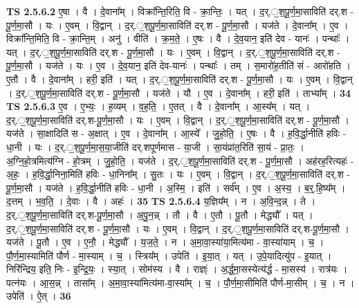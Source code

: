 \documentclass[17pt]{extarticle}
\begin{document}
                  \newline
                                \textbf{ TS 2.5.6.2} \newline
                  ए॒षा । वै । दे॒वाना᳚म् । विक्रा᳚न्ति॒रिति॒ वि - क्रा॒न्तिः॒ । यत् । द॒र्.॒श॒पू॒र्ण॒मा॒साविति॑ दर्.श - पू॒र्ण॒मा॒सौ । यः । ए॒वम् । वि॒द्वान् । द॒र्.॒श॒पू॒र्ण॒मा॒साविति॑ दर्.श - पू॒र्ण॒मा॒सौ । यज॑ते । दे॒वाना᳚म् । ए॒व । विक्रा᳚न्ति॒मिति॒ वि - क्रा॒न्ति॒म् । अनु॑ । वीति॑ । क्र॒म॒ते॒ । ए॒षः । वै । दे॒व॒यान॒ इति॑ देव - यानः॑ । पन्थाः᳚ । यत् । द॒र्.॒श॒पू॒र्ण॒मा॒साविति॑ दर्.श - पू॒र्ण॒मा॒सौ । यः । ए॒वम् । वि॒द्वान् । द॒र्.॒श॒पू॒र्ण॒मा॒साविति॑ दर्.श - पू॒र्ण॒मा॒सौ । यज॑ते । यः । ए॒व । दे॒व॒यान॒ इति॑ देव-यानः॑ । पन्थाः᳚ । तम् । स॒मारो॑ह॒तीति॑ सं - आरो॑हति । ए॒तौ । वै । दे॒वाना᳚म् । हरी॒ इति॑ । यत् । द॒र्.॒श॒पू॒र्ण॒मा॒साविति॑ दर्.श - पू॒र्ण॒मा॒सौ । यः । ए॒वम् । वि॒द्वान् । द॒र्.॒श॒पू॒र्ण॒मा॒साविति॑ दर्.श - पू॒र्ण॒मा॒सौ । यज॑ते । यौ । ए॒व । दे॒वाना᳚म् । हरी॒ इति॑ । ताभ्या᳚म् । \textbf{  34} \newline
                  \newline
                                \textbf{ TS 2.5.6.3} \newline
                  ए॒व । ए॒भ्यः॒ । ह॒व्यम् । व॒ह॒ति॒ । ए॒तत् । वै । दे॒वाना᳚म् । आ॒स्य᳚म् । यत् । द॒र्.॒श॒पू॒र्ण॒मा॒साविति॑ दर्.श-पू॒र्ण॒मा॒सौ । यः । ए॒वम् । वि॒द्वान् । द॒र्.॒श॒पू॒र्ण॒मा॒साविति॑ दर्.श - पू॒र्ण॒मा॒सौ । यज॑ते । सा॒क्षादिति॑ स - अ॒क्षात् । ए॒व । दे॒वाना᳚म् । आ॒स्ये᳚ । जु॒हो॒ति॒ । ए॒षः । वै । ह॒वि॒र्द्धा॒नीति॑ हविः - धा॒नी । यः । द॒र्.॒श॒पू॒र्ण॒मा॒स॒या॒जीति॑ दर्.शपूर्णमास - या॒जी । सा॒यंप्रा॑त॒रिति॑ सा॒यं - प्रा॒तः॒ । अ॒ग्नि॒हो॒त्रमित्य॑ग्नि - हो॒त्रम् । जु॒हो॒ति॒ । यज॑ते । द॒र्.॒श॒पू॒र्ण॒मा॒साविति॑ दर्.श - पू॒र्ण॒मा॒सौ । अह॑रह॒रित्यहः॑ - अ॒हः॒ । ह॒वि॒र्द्धा॒निना॒मिति॑ हविः - धा॒निना᳚म् । सु॒तः । यः । ए॒वम् । वि॒द्वान् । द॒र्.॒श॒पू॒र्ण॒मा॒साविति॑ दर्.श - पू॒र्ण॒मा॒सौ । यज॑ते । ह॒वि॒र्द्धा॒नीति॑ हविः - धा॒नी । अ॒स्मि॒ । इति॑ । सर्व᳚म् । ए॒व । अ॒स्य॒ । ब॒र्॒.हि॒ष्य᳚म् । द॒त्तम् । भ॒व॒ति॒ । दे॒वाः । वै । अहः॑ । \textbf{  35} \newline
                  \newline
                                \textbf{ TS 2.5.6.4} \newline
                  य॒ज्ञिय᳚म् । न । अ॒वि॒न्द॒न्न् । ते । द॒र्.॒श॒पू॒र्ण॒मा॒साविति॑ दर्.श-पू॒र्ण॒मा॒सौ । अ॒पु॒न॒न्न् । तौ । वै । ए॒तौ । पू॒तौ । मेद्ध्यौ᳚ । यत् । द॒र्.॒श॒पू॒र्ण॒मा॒साविति॑ दर्.श - पू॒र्ण॒मा॒सौ । यः । ए॒वम् । वि॒द्वान् । द॒र्.॒श॒पू॒र्ण॒मा॒साविति॑ दर्.श-पू॒र्ण॒मा॒सौ । यज॑ते । पू॒तौ । ए॒व । ए॒नौ॒ । मेद्ध्यौ᳚ । य॒ज॒ते॒ । न । अ॒मा॒वा॒स्या॑या॒मित्य॑मा - वा॒स्या॑याम् । च॒ । पौ॒र्ण॒मा॒स्यामिति॑ पौर्ण - मा॒स्याम् । च॒ । स्त्रिय᳚म् । उपेति॑ । इ॒या॒त् । यत् । उ॒पे॒यादित्यु॑प - इ॒यात् । निरि॑न्द्रिय॒ इति॒ निः - इ॒न्द्रि॒यः॒ । स्या॒त् । सोम॑स्य । वै । राज्ञ्ः॑ । अ॒र्द्ध॒मा॒सस्येत्य॑र्द्ध - मा॒सस्य॑ । रात्र॑यः । पत्न॑यः । आ॒स॒न्न् । तासा᳚म् । अ॒मा॒वा॒स्या॑मित्य॑मा-वा॒स्या᳚म् । च॒ । पौ॒र्ण॒मा॒सीमिति॑ पौर्ण-मा॒सीम् । च॒ । न । उपेति॑ । ऐ॒त् । \textbf{  36} \newline
\end{document}
